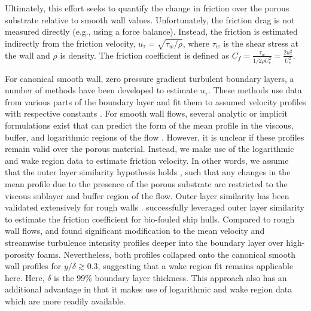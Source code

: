 \documentclass[letterpaper,11pt]{article}
\begin{document}
Ultimately, this effort seeks to quantify the change in friction over the porous substrate relative to smooth wall values. Unfortunately, the friction drag is not measured directly (e.g., using a force balance). Instead, the friction is estimated indirectly from the friction velocity, $u_\tau= \sqrt{\tau_w/\rho}$, where $\tau_w$ is the shear stress at the wall and $\rho$ is density. The friction coefficient is defined as $C_f =\frac{\tau_w }{1/2 \rho U_e^2} = \frac{2 u_\tau^2}{U_e^2}$. 

For canonical smooth wall, zero pressure gradient turbulent boundary layers, a number of methods have been developed to estimate $u_\tau$. These methods use data from various parts of the boundary layer and fit them to assumed velocity profiles with respective constants \citep[see e.g.,][]{rodriguez2015robust}.  For smooth wall flows, several analytic or implicit formulations exist that can predict the form of the mean profile in the viscous, buffer, and logarithmic regions of the flow \citep[e.g.,][]{clauser1956turbulent,musker1979explicit,kendall2006method}. However, it is unclear if these profiles remain valid over the porous material. Instead, we make use of the logarithmic and wake region data to estimate friction velocity.  In other words, we assume that the outer layer similarity hypothesis holds \citep{townsend1980structure}, such that any changes in the mean profile due to the presence of the porous substrate are restricted to the viscous sublayer and buffer region of the flow.  Outer layer similarity has been validated extensively for rough walls \citep[e.g.,][]{acharya1986turbulent,krogstad1992comparison,flack2007examination}. \citet{monty2016assessment} successfully leveraged outer layer similarity to estimate the friction coefficient for bio-fouled ship hulls. Compared to rough wall flows, \citet{manes2011turbulent} and \citet{efstathiou2018mean} found significant modification to the mean velocity and streamwise turbulence intensity profiles deeper into the boundary layer over high-porosity foams. Nevertheless, both profiles collapsed onto the canonical smooth wall profiles for $y/\delta \gtrsim 0.3$, suggesting that a wake region fit remains applicable here.  Here, $\delta$ is the 99\% boundary layer thickness. This approach also has an additional advantage in that it makes use of logarithmic and wake region data which are more readily available. 

\end{document}
